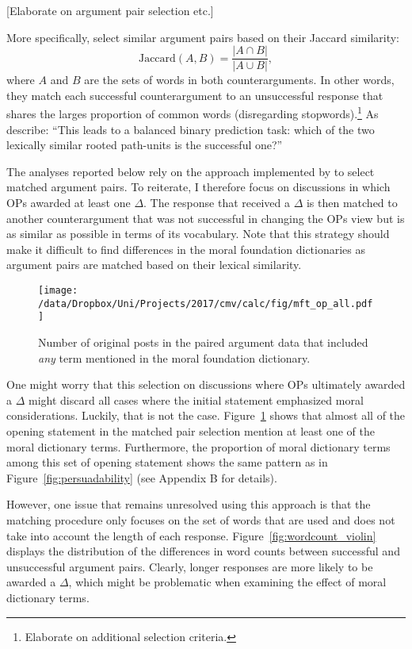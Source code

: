 {[}Elaborate on argument pair selection etc.{]}

More specifically, \citet{tan2016winning} select similar argument pairs based on their Jaccard similarity:
\begin{equation}
\text{Jaccard}(A,B)=\dfrac{|A\cap B|}{|A\cup B|},
\end{equation}
where $A$ and $B$ are the sets of words in both counterarguments. In other words, they match each successful counterargument to an unsuccessful response that shares the larges proportion of common words (disregarding stopwords).\footnote{Elaborate on additional selection criteria.} As \citet[5]{tan2016winning} describe: ``This leads to a balanced binary prediction task: which of the two lexically similar rooted path-units is the successful one?''

The analyses reported below rely on the approach implemented by \citet{tan2016winning} to select matched argument pairs. To reiterate, I therefore focus on discussions in which OPs awarded at least one $\Delta$. The response that received a $\Delta$ is then matched to another counterargument that was not successful in changing  the OPs view but is as similar as possible in terms of its vocabulary. Note that this strategy should make it difficult to find differences in the moral foundation dictionaries as argument pairs are matched based on their lexical similarity.

\begin{figure}[ht]
\centering
\texttt{[image: /data/Dropbox/Uni/Projects/2017/cmv/calc/fig/mft\_op\_all.pdf]}
\caption{Number of original posts in the paired argument data that included \textit{any} term mentioned in the moral foundation dictionary.}\label{fig:mft_op_all}
\end{figure}

One might worry that this selection on discussions where OPs ultimately awarded a $\Delta$ might discard all cases where the initial statement emphasized moral considerations. Luckily, that is not the case. Figure~\ref{fig:mft_op_all} shows that almost all of the opening statement in the matched pair selection mention at least one of the moral dictionary terms. Furthermore, the proportion of moral dictionary terms among this set of opening statement shows the same pattern as in Figure~\ref{fig:persuadability} (see Appendix B for details).

However, one issue that remains unresolved using this approach is that the matching procedure only focuses on the set of words that are used and does not take into account the length of each response. Figure~\ref{fig:wordcount_violin} displays the distribution of the differences in word counts between successful and unsuccessful argument pairs. Clearly, longer responses are more likely to be awarded a $\Delta$, which might be problematic when examining the effect of moral dictionary terms.

